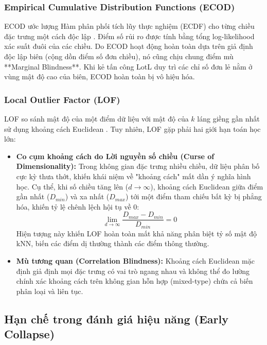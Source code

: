 \documentclass[../main.tex]{subfiles}
\begin{document}
\subsubsection{Empirical Cumulative Distribution Functions (ECOD)}
ECOD ước lượng Hàm phân phối tích lũy thực nghiệm (ECDF) cho từng chiều đặc trưng một cách độc lập \cite{li2023ecod}. Điểm số rủi ro được tính bằng tổng log-likelihood xác suất đuôi của các chiều. Do ECOD hoạt động hoàn toàn dựa trên giả định độc lập biên (cộng dồn điểm số đơn chiều), nó cũng chịu chung điểm mù **Marginal Blindness**. Khi kẻ tấn công LotL duy trì các chỉ số đơn lẻ nằm ở vùng mật độ cao của biên, ECOD hoàn toàn bị vô hiệu hóa.

\subsubsection{Local Outlier Factor (LOF)}
LOF so sánh mật độ của một điểm dữ liệu với mật độ của $k$ láng giềng gần nhất sử dụng khoảng cách Euclidean \cite{breunig2000lof}. Tuy nhiên, LOF gặp phải hai giới hạn toán học lớn:
\begin{itemize}
    \item \textbf{Co cụm khoảng cách do Lời nguyền số chiều (Curse of Dimensionality):} Trong không gian đặc trưng nhiều chiều, dữ liệu phân bố cực kỳ thưa thớt, khiến khái niệm về "khoảng cách" mất dần ý nghĩa hình học. Cụ thể, khi số chiều tăng lên ($d \to \infty$), khoảng cách Euclidean giữa điểm gần nhất ($D_{min}$) và xa nhất ($D_{max}$) tới một điểm tham chiếu bất kỳ bị phẳng hóa, khiến tỷ lệ chênh lệch hội tụ về 0:
    \begin{equation}
        \lim_{d \to \infty} \frac{D_{max} - D_{min}}{D_{min}} = 0
    \end{equation}
    Hiện tượng này \cite{francois2007concentration} khiến LOF hoàn toàn mất khả năng phân biệt tỷ số mật độ kNN, biến các điểm dị thường thành các điểm thông thường.
    \item \textbf{Mù tương quan (Correlation Blindness):} Khoảng cách Euclidean mặc định giả định mọi đặc trưng có vai trò ngang nhau và không thể đo lường chính xác khoảng cách trên không gian hỗn hợp (mixed-type) chứa cả biến phân loại và liên tục.
\end{itemize}

\subsection{Hạn chế trong đánh giá hiệu năng (Early Collapse)}
\label{subsection:2.1.3}
\end{document}
